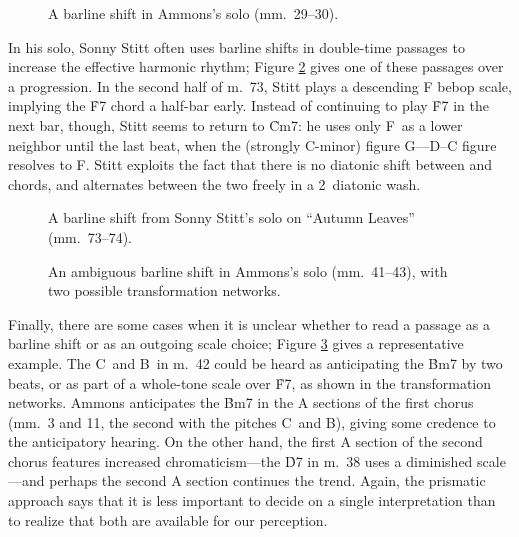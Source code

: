 \begin{figure}[tbp]
  \caption[A barline shift from Ammons's solo.]{A barline shift in Ammons's
    solo (mm.~29--30).}
  \label{csa:metric-delay}
\end{figure}

In his solo, Sonny Stitt often uses barline shifts in double-time passages to
increase the effective harmonic rhythm; Figure \ref{csa:stitt-double-time}
gives one of these passages over a \tf progression. In the second
half of m.~73, Stitt plays a descending F bebop scale, implying the \h{F7}
chord a half-bar early. Instead of continuing to play \h{F7} in the
next bar, though, Stitt seems to return to \h{Cm7}: he uses only F\sharp\ as a
lower neighbor until the last beat, when the (strongly C-minor) figure
G--\Eflat--D--C figure resolves to F\nat. Stitt exploits the fact that there
is no diatonic shift between \ii and \V chords, and alternates between the
two freely in a 2\flat\ diatonic wash.

\begin{figure}[tbp]
  \caption[A barline shift from Sonny Stitt's solo on ``Autumn Leaves.'']{A
    barline shift from Sonny Stitt's solo on ``Autumn Leaves'' (mm.~73--74).}
  \label{csa:stitt-double-time}
\end{figure}

\begin{figure}[tbp]
  \caption[An ambiguous barline shift in Ammon's solo, with two possible
  transformation networks.]{An ambiguous barline shift in Ammons's
  solo (mm.~41--43), with two possible transformation networks.}
  \label{csa:metric-parsing}
\end{figure}

Finally, there are some cases when it is unclear whether to read a passage as
a barline shift or as an outgoing scale choice; Figure
\ref{csa:metric-parsing} gives a representative example. The
C\sharp\ and B\nat\ in m.~42 could be heard as anticipating the \h{Bm7} by two
beats, or as part of a whole-tone scale over \h{F7}, as shown in the
transformation networks. Ammons anticipates the \h{Bm7} in the A sections of
the first chorus (mm.~3 and 11, the second with the pitches C\sharp\ and
B\nat), giving some credence to the anticipatory hearing. On the other hand,
the first A section of the second chorus features increased chromaticism---the
\h{D7} in m.~38 uses a diminished scale---and perhaps the second A section
continues the trend. Again, the prismatic approach says that it is less
important to decide on a single interpretation than to realize that both
are available for our perception.

